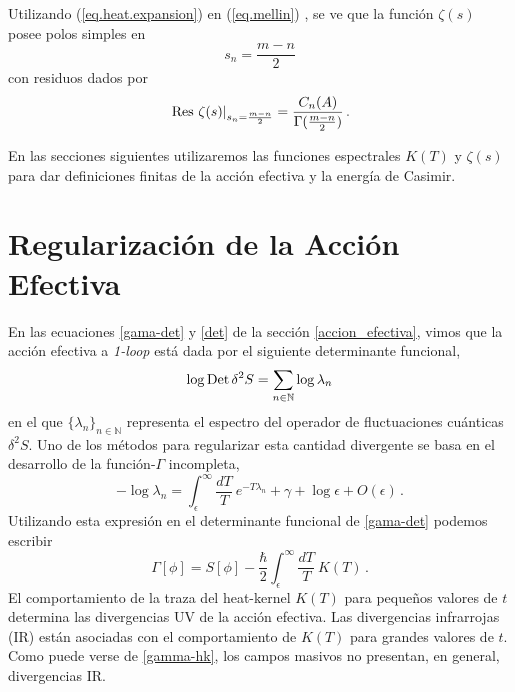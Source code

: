 Utilizando (\ref{eq.heat.expansion}) en  (\ref{eq.mellin}) , se ve que la función $\zeta (s)$ posee polos simples en
\begin{equation}
s _n = \frac{m-n}{2} 
\label{eq.ceros.zeta}
\end{equation}
con residuos dados por
\begin{equation}
\left. {\rm Res} \ \zeta  (s)  \right| _{s_n= \frac{m - n}{2}} =  
\frac{ C_n  (A) }{ {\Gamma ( \frac{m-n}{2}} ) }\,.
\label{losresi}
\end{equation}

En las secciones siguientes utilizaremos las funciones espectrales $K(T)$ y $\zeta(s) $ para dar definiciones finitas de la acción efectiva y la energía de Casimir.

\section{Regularización de la Acción Efectiva}\label{cap.acc}

En las ecuaciones \ref{gama-det} y \ref{det} de la sección \ref{accion_efectiva}, vimos que la acción efectiva a {\it 1-loop} está dada por el siguiente determinante funcional,
\begin{equation}
\log {\rm Det} \, \delta ^2 S = 
\sum_{n\in{\mathbb N}} \log \lambda _n
\end{equation}
en el que $\{\lambda_n\}_{n\in\mathbb N}$ representa el espectro del operador de fluctuaciones cuánticas $\delta^2S$. Uno de los métodos para regularizar esta cantidad divergente se basa en el desarrollo de la función-$\Gamma$ incompleta,
\begin{equation}
- \log\lambda_n=\int _ { \epsilon } ^{\infty}\frac{dT}{T}\ e ^{- T \lambda _n} +\gamma+\log\epsilon + O ( \epsilon  ) \,.
\end{equation}
Utilizando esta expresión en el determinante funcional de \eqref{gama-det} podemos escribir
\begin{equation}\label{gamma-hk}
\Gamma [ \phi ] = 
S[ \phi ] - 
\frac{\hbar }{2}
\int _ { \epsilon } ^{\infty} \frac{ dT}{T}\ K(T) \, .
\end{equation}
El comportamiento de la traza del heat-kernel $K(T)$ para pequeños valores de $t$ determina las divergencias UV de la acción efectiva. Las divergencias infrarrojas (IR) están asociadas con el comportamiento de $K(T)$ para grandes valores de $t$. Como puede verse de \eqref{gamma-hk}, los campos masivos no presentan, en general, divergencias IR.


